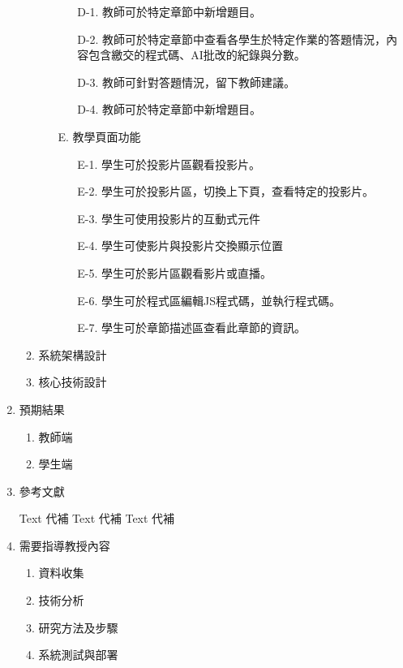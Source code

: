 \documentclass[12pt]{article}
\begin{document}
\begin{enumerate}
\begin{enumerate}
\begin{enumerate}
\begin{enumerate}
              \item [D-1.] 教師可於特定章節中新增題目。
              \item [D-2.] 教師可於特定章節中查看各學生於特定作業的答題情況，內容包含繳交的程式碼、AI批改的紀錄與分數。
              \item [D-3.] 教師可針對答題情況，留下教師建議。
              \item [D-4.] 教師可於特定章節中新增題目。
            \end{enumerate}
          \item [E.] 教學頁面功能
            \begin{enumerate}
              \item [E-1.] 學生可於投影片區觀看投影片。
              \item [E-2.] 學生可於投影片區，切換上下頁，查看特定的投影片。
              \item [E-3.] 學生可使用投影片的互動式元件
              \item [E-4.] 學生可使影片與投影片交換顯示位置
              \item [E-5.] 學生可於影片區觀看影片或直播。
              \item [E-6.] 學生可於程式區編輯JS程式碼，並執行程式碼。
              \item [E-7.] 學生可於章節描述區查看此章節的資訊。
            \end{enumerate}
          \end{enumerate}
      \item 系統架構設計
      \item 核心技術設計
    \end{enumerate}
  \item 預期結果
    \begin{enumerate}
      \setlength{\parindent}{2em}
      \item 教師端
      \item 學生端
    \end{enumerate}
  \item 參考文獻
    \renewcommand{\section}[2]{}
    \begin{thebibliography}{99}  
       Text 代補
       Text 代補
       Text 代補
    \end{thebibliography} 
  \item 需要指導教授內容
    \begin{enumerate}
      \setlength{\parindent}{2em}
      \item 資料收集
      \item 技術分析
      \item 研究方法及步驟
      \item 系統測試與部署
    \end{enumerate}
\end{enumerate}
\end{document}
